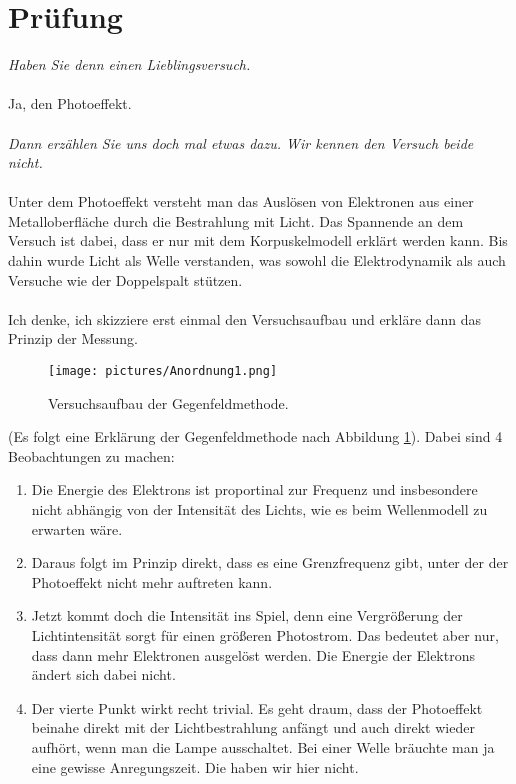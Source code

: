 \section{Prüfung}
\textit{Haben Sie denn einen Lieblingsversuch.}
\\\\\noindent
Ja, den Photoeffekt.
\\\\\noindent
\textit{Dann erzählen Sie uns doch mal etwas dazu. Wir kennen den Versuch beide nicht.}
\\\\\noindent
Unter dem Photoeffekt versteht man das Auslösen von Elektronen aus einer Metalloberfläche durch die Bestrahlung mit Licht. Das Spannende
an dem Versuch ist dabei, dass er nur mit dem Korpuskelmodell erklärt werden kann. Bis dahin wurde Licht als Welle verstanden, was sowohl
die Elektrodynamik als auch Versuche wie der Doppelspalt stützen.
\\\\\noindent
Ich denke, ich skizziere erst einmal den Versuchsaufbau und erkläre dann das Prinzip der Messung.
\begin{figure}[H]
    \centering
    \texttt{[image: pictures/Anordnung1.png]}
    \caption{Versuchsaufbau der Gegenfeldmethode. \cite{AP01}}
    \label{fig:Gegenfeld}
\end{figure}
\noindent 
(Es folgt eine Erklärung der Gegenfeldmethode nach Abbildung \ref{fig:Gegenfeld}). 
Dabei sind 4 Beobachtungen zu machen:
\begin{enumerate}
    \item Die Energie des Elektrons ist proportinal zur Frequenz und insbesondere nicht abhängig von der Intensität des Lichts, wie es beim 
        Wellenmodell zu erwarten wäre. 
    \item Daraus folgt im Prinzip direkt, dass es eine Grenzfrequenz gibt, unter der der Photoeffekt nicht mehr auftreten kann.
    \item Jetzt kommt doch die Intensität ins Spiel, denn eine Vergrößerung der Lichtintensität sorgt für einen größeren Photostrom. 
        Das bedeutet aber nur, dass dann mehr Elektronen ausgelöst werden. Die Energie der Elektrons ändert sich dabei nicht.
    \item Der vierte Punkt wirkt recht trivial. Es geht draum, dass der Photoeffekt beinahe direkt mit der Lichtbestrahlung anfängt
        und auch direkt wieder aufhört, wenn man die Lampe ausschaltet. Bei einer Welle bräuchte man ja eine gewisse Anregungszeit. Die 
        haben wir hier nicht.
\end{enumerate}
